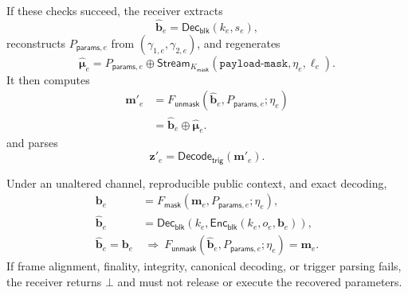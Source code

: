 \documentclass[journal]{IEEEtran}
\theoremstyle{definition}
\theoremstyle{game}
\begin{document}
If these checks succeed, the receiver extracts
\begin{equation}
\label{eq:blockchain_decode}
\widehat{\mathbf{b}}_e
=
\mathsf{Dec}_{\mathsf{blk}}
\left(
k_e,s_e
\right),
\end{equation}
reconstructs
$P_{\mathsf{params},e}$ from
$(\gamma_{1,e},\gamma_{2,e})$, and regenerates
\begin{equation}
\label{eq:blockchain_recreated_mask}
\widehat{\boldsymbol\mu}_e=P_{\mathsf{params},e}\oplus\mathsf{Stream}_{K_{\mathsf{mask}}}(\texttt{payload-mask},\eta_e,\ell_e).
\end{equation}
It then computes
\begin{equation}
\label{eq:blockchain_unmask}
\begin{aligned}
\mathbf m'_e
 &=F_{\mathsf{unmask}}(\widehat{\mathbf b}_e,P_{\mathsf{params},e};\eta_e)\\
 &=\widehat{\mathbf b}_e\oplus\widehat{\boldsymbol\mu}_e .
\end{aligned}
\end{equation}
and parses
\begin{equation}
\label{eq:blockchain_trigger_decode}
\mathbf{z}'_e
=
\mathsf{Decode}_{\mathsf{trig}}
\left(
\mathbf{m}'_e
\right).
\end{equation}

Under an unaltered channel, reproducible public context, and exact
decoding,
\begin{equation}
\label{eq:blockchain_correctness}
\begin{aligned}
\mathbf b_e&=F_{\mathsf{mask}}(\mathbf m_e,P_{\mathsf{params},e};\eta_e),\\
\widehat{\mathbf b}_e&=\mathsf{Dec}_{\mathsf{blk}}(k_e,
  \mathsf{Enc}_{\mathsf{blk}}(k_e,o_e,\mathbf b_e)),\\
\widehat{\mathbf b}_e=\mathbf b_e
&\ \Longrightarrow\ 
F_{\mathsf{unmask}}(\widehat{\mathbf b}_e,P_{\mathsf{params},e};\eta_e)
=\mathbf m_e .
\end{aligned}
\end{equation}
If frame alignment, finality, integrity, canonical decoding, or
trigger parsing fails, the receiver returns $\bot$ and must not
release or execute the recovered parameters.
\end{document}
